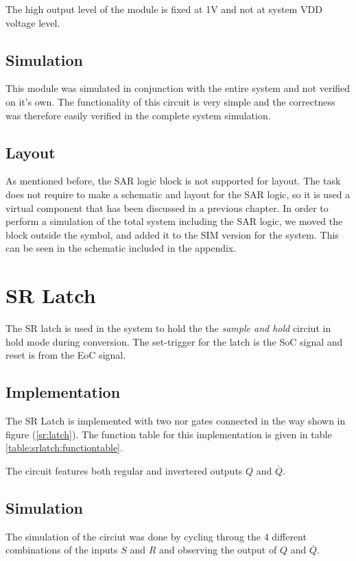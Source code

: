 \documentclass[english, 12pt, a4paper]{ifimaster}
\begin{document}
The high output level of the module is fixed at 1V and not at system VDD voltage level.
\subsection{Simulation}
This module was simulated in conjunction with the entire system and not verified on it's own. 
The functionality of this circuit is very simple and the correctness was therefore easily verified in the complete system simulation.

\subsection{Layout}
As mentioned before, the SAR logic block is not supported for layout. The task does not require to make a schematic and layout for the SAR logic, so it is used a 
virtual component that has been discussed in a previous chapter. In order to perform a simulation of the total system including the SAR logic, we moved the block 
outside the symbol, and added it to the SIM version for the system. This can be seen in the schematic included in the appendix. 

\section{SR Latch}
The SR latch is used in the system to hold the the \textit{sample and hold} circiut in hold mode during conversion. 
The set-trigger for the latch is the SoC signal and reset is from the EoC signal. 

\subsection{Implementation}
The SR Latch is implemented with two nor gates connected in the way shown in figure (\ref{sr:latch}).
The function table for this implementation is given in table \ref{table:srlatch:functiontable}.

The circuit features both regular and invertered outputs \(Q\) and \(\overline{Q}\).

\subsection{Simulation}
The simulation of the circiut was done by cycling throug the 4 different combinations of the inputs \(S\) and \(R\) and observing the output of \(Q\) and \(\overline{Q}\).
\end{document}
